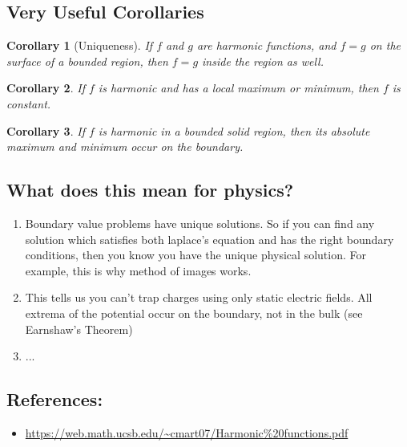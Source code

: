 \documentclass[12pt,fleqn]{article}
\numberwithin{equation}{section} %
\newtheorem{corollary}{Corollary}
\newcounter{problem}
\begin{document}
\subsection{Very Useful Corollaries}
\begin{corollary}[Uniqueness]
	If $f$ and $g$ are harmonic functions, and $f=g$ on the surface of a bounded region, then $f=g$ inside the region as well.
\end{corollary}
\begin{corollary}
	If $f$ is harmonic and has a local maximum or minimum, then $f$ is constant.
\end{corollary}
\begin{corollary}
	If $f$ is harmonic in a bounded solid region, then its absolute maximum and minimum occur on the boundary.
\end{corollary}


\subsection{What does this mean for physics?}
\begin{enumerate}
	\item Boundary value problems have unique solutions. So if you can find any solution which satisfies both laplace's equation and has the right boundary conditions, then you know you have the unique physical solution. For example, this is why method of images works.
	\item This tells us you can't trap charges using only static electric fields. All extrema of the potential occur on the boundary, not in the bulk (see Earnshaw's Theorem)
	\item ...
	
\end{enumerate}


\subsection{References:}
\begin{itemize}
	\item \url{https://web.math.ucsb.edu/~cmart07/Harmonic\%20functions.pdf}
\end{itemize}


\newpage
\end{document}
